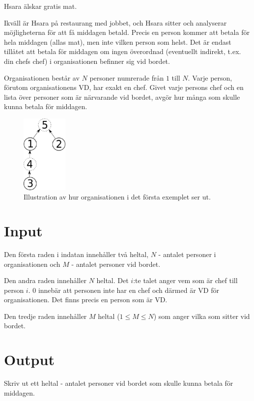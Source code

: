 
Hsara älskar gratis mat.

Ikväll är Hsara på restaurang med jobbet, och Hsara sitter och analyserar möjligheterna för att få middagen betald. Precis en person kommer att betala för hela middagen (allas mat), men inte vilken person som helst. Det är endast tillåtet att betala för middagen om ingen överordnad (eventuellt indirekt, t.ex. din chefs chef) i organisationen befinner sig vid bordet.

Organisationen består av $N$ personer numrerade från $1$ till $N$. Varje person, förutom organisationens VD, har exakt en chef. Givet varje persons chef och en lista över personer som är närvarande vid bordet, avgör hur många som skulle kunna betala för middagen.

\begin{figure}[h!]
	\begin{center}
		\includegraphics[width=0.2\textwidth]{tree.eps}
		\caption{Illustration av hur organisationen i det första exemplet ser ut.}
	\end{center}
\end{figure}

\section*{Input}

Den första raden i indatan innehåller två heltal, $N$ - antalet personer i organisationen och $M$ - antalet personer vid bordet.

Den andra raden innehåller $N$ heltal. Det $i$:te talet anger vem som är chef till person $i$. 0 innebär att personen inte har en chef och därmed är VD för organisationen. Det finns precis en person som är VD.

Den tredje raden innehåller $M$ heltal ($1 \le M \le N$) som anger vilka som sitter vid bordet.

\section*{Output}
Skriv ut ett heltal - antalet personer vid bordet som skulle kunna betala för middagen.

